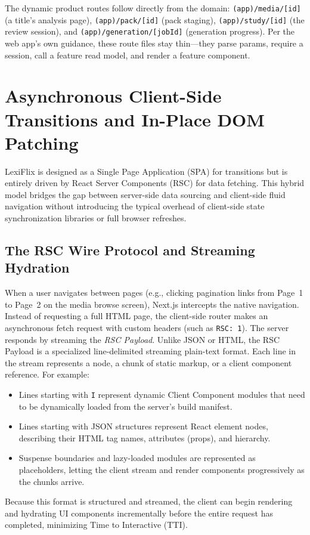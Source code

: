 The dynamic product routes follow directly from the domain: \texttt{(app)/media/[id]}
(a title's analysis page), \texttt{(app)/pack/[id]} (pack staging), \texttt{(app)/study/[id]}
(the review session), and \texttt{(app)/generation/[jobId]} (generation progress). Per the
web app's own guidance, these route files stay thin---they parse params, require a
session, call a feature read model, and render a feature component.

\section{Asynchronous Client-Side Transitions and In-Place DOM Patching}
\label{sec:client-side-transitions}
LexiFlix is designed as a Single Page Application (SPA) for transitions but is entirely driven by React Server Components (RSC) for data fetching. This hybrid model bridges the gap between server-side data sourcing and client-side fluid navigation without introducing the typical overhead of client-side state synchronization libraries or full browser refreshes.
\subsection{The RSC Wire Protocol and Streaming Hydration}
When a user navigates between pages (e.g., clicking pagination links from Page~1 to Page~2 on the media browse screen), Next.js intercepts the native navigation. Instead of requesting a full HTML page, the client-side router makes an asynchronous fetch request with custom headers (such as \texttt{RSC: 1}). The server responds by streaming the \emph{RSC Payload}.
Unlike JSON or HTML, the RSC Payload is a specialized line-delimited streaming plain-text format. Each line in the stream represents a node, a chunk of static markup, or a client component reference. For example:
\begin{itemize}
	\item Lines starting with \texttt{I} represent dynamic Client Component modules that need to be dynamically loaded from the server's build manifest.
	\item Lines starting with JSON structures represent React element nodes, describing their HTML tag names, attributes (props), and hierarchy.
	\item Suspense boundaries and lazy-loaded modules are represented as placeholders, letting the client stream and render components progressively as the chunks arrive.
\end{itemize}
Because this format is structured and streamed, the client can begin rendering and hydrating UI components incrementally before the entire request has completed, minimizing Time to Interactive (TTI).
